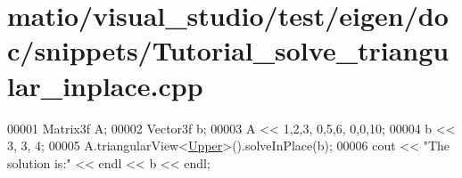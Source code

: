 \hypertarget{matio_2visual__studio_2test_2eigen_2doc_2snippets_2_tutorial__solve__triangular__inplace_8cpp_source}{}\section{matio/visual\+\_\+studio/test/eigen/doc/snippets/\+Tutorial\+\_\+solve\+\_\+triangular\+\_\+inplace.cpp}
\label{matio_2visual__studio_2test_2eigen_2doc_2snippets_2_tutorial__solve__triangular__inplace_8cpp_source}

\begin{DoxyCode}
00001 Matrix3f A;
00002 Vector3f b;
00003 A << 1,2,3,  0,5,6,  0,0,10;
00004 b << 3, 3, 4;
00005 A.triangularView<\hyperlink{group__enums_gga39e3366ff5554d731e7dc8bb642f83cda6bcb58be3b8b8ec84859ce0c5ac0aaec}{Upper}>().solveInPlace(b);
00006 cout << \textcolor{stringliteral}{"The solution is:"} << endl << b << endl;
\end{DoxyCode}
